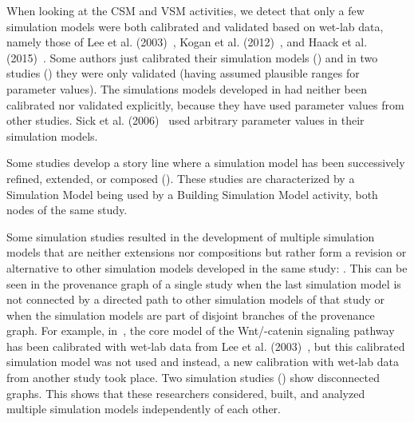 \documentclass[10pt,letterpaper]{article}
\newcommand{\bcat}{\textbeta-catenin}
\newcommand{\wnt}{Wnt}
\newcommand{\lee}{Lee et al. (2003)}
\newcommand{\SM}{Simulation Model}
\newcommand{\BSM}{Building Simulation Model}
\begin{document}
When looking at the CSM{} and VSM{} activities, we detect that only a few simulation models were both calibrated and validated based on wet-lab data, namely those of \lee{}~\cite{Lee2003}, Kogan et al. (2012)~\cite{Kogan2012}, and Haack et al. (2015)~\cite{Haack2015}.
Some authors just calibrated their simulation models (\cite{Rodriguez2007, Mazemondet2012, Wang2013, Chen2014, Padala2017, Staehlke2020}) and in two studies (\cite{Cho2006, Haack2020}) they were only validated (having assumed plausible ranges for parameter values).
The simulations models developed in \cite{Kruger2004, Kim2007, vanLeeuwen2007, Wawra2007, Goldbeter2008, vanLeeuwen2009, Mirams2010} had neither been calibrated nor validated explicitly, because they have used parameter values from other studies.
Sick et al. (2006)~\cite{Sick2006} used arbitrary parameter values in their simulation models.

Some studies develop a story line where a simulation model has been successively refined, extended, or composed (\cite{Lee2003, Rodriguez2007, vanLeeuwen2007, Goldbeter2008, Mirams2010, Mazemondet2012, Wang2013, Chen2014, Haack2015, Haack2020}).
These studies are characterized by a \SM{} being used by a \BSM{} activity, both nodes of the same study.

Some simulation studies resulted in the development of multiple simulation models that are neither extensions nor compositions but rather form a revision or alternative to other simulation models developed in the same study: \cite{Rodriguez2007, vanLeeuwen2009, Mirams2010, Mazemondet2012, Wang2013, Chen2014}.
This can be seen in the provenance graph of a single study when the last simulation model is not connected by a directed path to other simulation models of that study or when the simulation models are part of disjoint branches of the provenance graph.
For example, in~\cite{Mazemondet2012}, the core model of the \wnt{}/\bcat{} signaling pathway has been calibrated with wet-lab data from \lee{}~\cite{Lee2003}, but this calibrated simulation model was not used and instead, a new calibration with wet-lab data from another study took place.
Two simulation studies (\cite{Wawra2007, Mirams2010}) show disconnected graphs.
This shows that these researchers considered, built, and analyzed multiple simulation models independently of each other.


\end{document}
